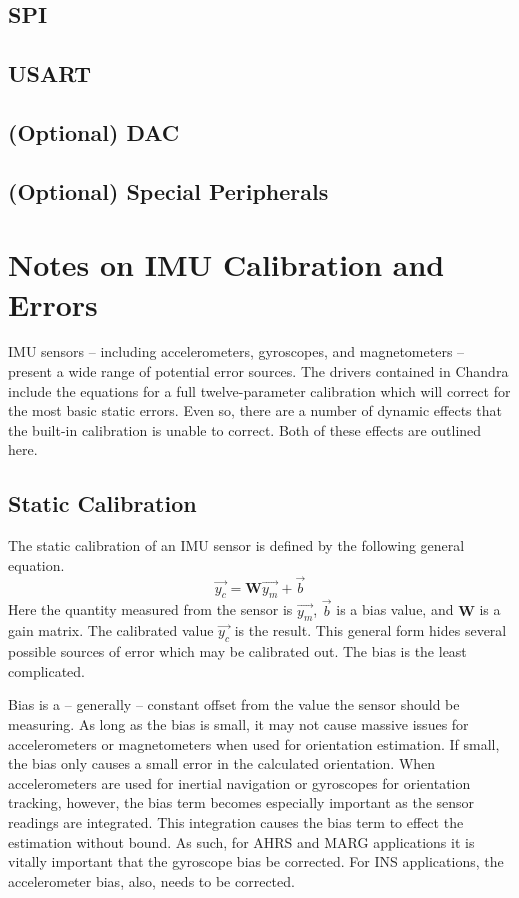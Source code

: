 \documentclass[10pt,letterpaper]{memoir} %
\begin{document}
\section{SPI}
\section{USART}

\section{(Optional) DAC}
\section{(Optional) Special Peripherals}

\chapter{Notes on IMU Calibration and Errors}
IMU sensors -- including accelerometers, gyroscopes, and magnetometers -- present a wide range of potential error sources.  The drivers contained in Chandra include the equations for a full twelve-parameter calibration which will correct for the most basic static errors.  Even so, there are a number of dynamic effects that the built-in calibration is unable to correct.  Both of these effects are outlined here.

\section{Static Calibration}
The static calibration of an IMU sensor is defined by the following general equation.
\begin{equation}
	\vec{y_c} = \mathbf{W}\vec{y_m} + \vec{b}
\end{equation}
Here the quantity measured from the sensor is $\vec{y_m}$, $\vec{b}$ is a bias value, and $\mathbf{W}$ is a gain matrix.  The calibrated value $\vec{y_c}$ is the result.  This general form hides several possible sources of error which may be calibrated out.  The bias is the least complicated.

Bias is a -- generally -- constant offset from the value the sensor should be measuring.  As long as the bias is small, it may not cause massive issues for accelerometers or magnetometers when used for orientation estimation.  If small, the bias only causes a small error in the calculated orientation.  When accelerometers are used for inertial navigation or gyroscopes for orientation tracking, however, the bias term becomes especially important as the sensor readings are integrated.  This integration causes the bias term to effect the estimation without bound.  As such, for AHRS and MARG applications it is vitally important that the gyroscope bias be corrected.  For INS applications, the accelerometer bias, also, needs to be corrected.
\end{document}
